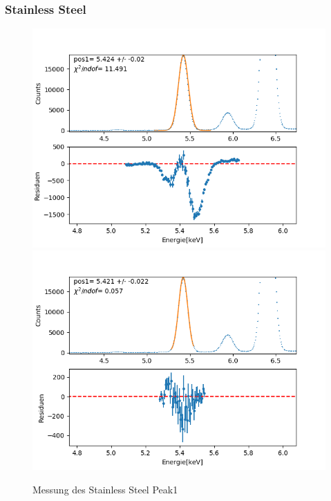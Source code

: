 \documentclass[12pt,a4paper]{article}
\begin{document}
\subsubsection{Stainless Steel}
\begin{figure}[H]
\centering
\includegraphics[scale=0.49]{Bilder/roentgen_spektren/stahl/rub1_1.png}
\includegraphics[scale=0.49]{Bilder/roentgen_spektren/stahl/rub1_2.png}
\caption{Messung des Stainless Steel Peak1}
\end{figure}
\end{document}
